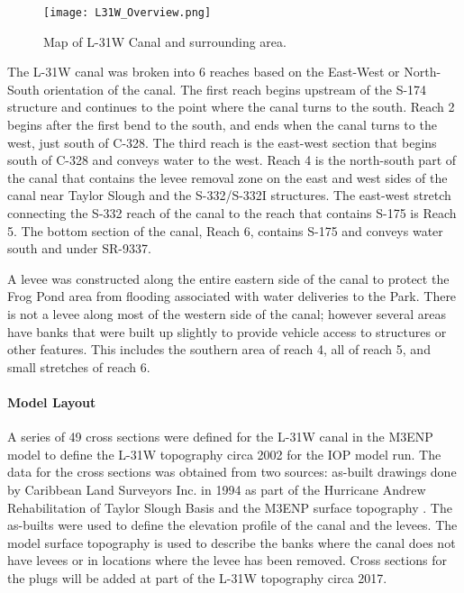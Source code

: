 \begin{figure}[!h]
  \begin{center}
  \texttt{[image: L31W\_Overview.png]}
  \caption[Map of L-31W Canal and surrounding area.]{Map of L-31W Canal and surrounding area.}
  \label{fig:L31W_Overview}
  \end{center}
\end{figure}

The L-31W canal was broken into 6 reaches based on the East-West or North-South orientation of the canal.  The first reach begins upstream of the S-174 structure and continues to the point where the canal turns to the south.  Reach 2 begins after the first bend to the south, and ends when the canal turns to the west, just south of C-328.  The third reach is the east-west section that begins south of C-328 and conveys water to the west.  Reach 4 is the north-south part of the canal that contains the levee removal zone on the east and west sides of the canal near Taylor Slough and the S-332/S-332I structures.  The east-west stretch connecting the S-332 reach of the canal to the reach that contains S-175 is Reach 5.  The bottom section of the canal, Reach 6, contains S-175 and conveys water south and under SR-9337.

A levee was constructed along the entire eastern side of the canal to protect the Frog Pond area from flooding associated with water deliveries to the Park.  There is not a levee along most of the western side of the canal; however several areas have banks that were built up slightly to provide vehicle access to structures or other features.  This includes the southern area of reach 4, all of reach 5, and small stretches of reach 6.

\paragraph{Model Layout}

A series of 49 cross sections were defined for the L-31W canal in the M3ENP model to define the L-31W topography circa 2002 for the IOP model run.   The data for the cross sections was obtained from two sources: as-built drawings done by Caribbean Land Surveyors Inc. in 1994 as part of the Hurricane Andrew Rehabilitation of Taylor Slough Basis and the M3ENP surface topography \citep{L31Wtopo}.   The as-builts were used to define the elevation profile of the canal and the levees.  The model surface topography is used to describe the banks where the canal does not have levees or in locations where the levee has been removed.  Cross sections for the plugs will be added at part of the L-31W topography circa 2017.

